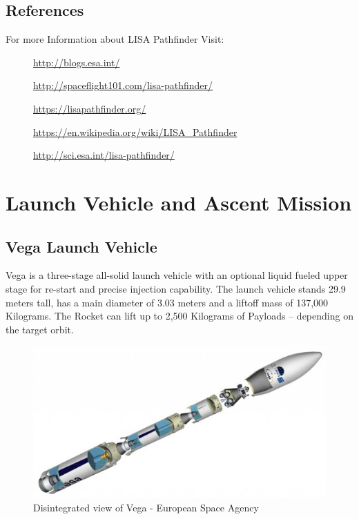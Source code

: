 \documentclass[11pt,fleqn]{book} %
\begin{document}
\section{References}
For more Information about LISA Pathfinder Visit:
		\begin{description}
        	\item[]\url{http://blogs.esa.int/}
            \item[]\url{http://spaceflight101.com/lisa-pathfinder/}
            \item[]\url{https://lisapathfinder.org/}
            \item[]\url{https://en.wikipedia.org/wiki/LISA_Pathfinder}
            \item[]\url{http://sci.esa.int/lisa-pathfinder/}
        \end{description}


\chapter{Launch Vehicle and Ascent Mission}

\section{Vega Launch Vehicle}
Vega is a three-stage all-solid launch vehicle with an optional liquid fueled upper stage for re-start and precise injection capability. The launch vehicle stands 29.9 meters tall, has a main diameter of 3.03 meters and a liftoff mass of 137,000 Kilograms. The Rocket can lift up to 2,500 Kilograms of Payloads – depending on the target orbit.
\begin{figure}[h]
    \centering
    \includegraphics[width=1.0\textwidth]{5939181_orig-512x266.png}
    \caption{Disintegrated view of Vega - European Space Agency}
    \label{fig:awesome_image}
\end{figure}
\end{document}
